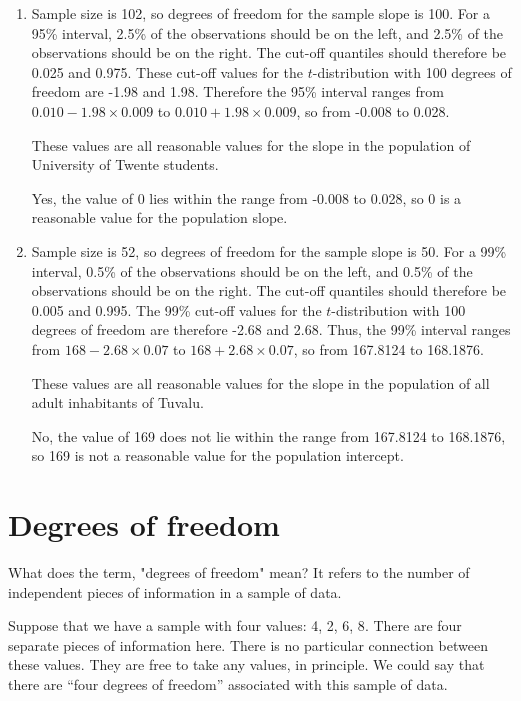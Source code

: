 \documentclass[]{report}\usepackage[]{graphicx}\usepackage[]{color}
\begin{document}
\begin{enumerate}

\item Sample size is 102, so degrees of freedom for the sample slope is 100. For a 95\% interval, 2.5\% of the observations should be on the left, and 2.5\% of the observations should be on the right. The cut-off quantiles should therefore be 0.025 and 0.975. These cut-off values for the $t$-distribution with 100 degrees of freedom are -1.98 and 1.98. Therefore the 95\% interval ranges from $0.010 - 1.98 \times 0.009$ to $0.010 + 1.98 \times 0.009$, so from -0.008 to 0.028.

\subitem These values are all reasonable values for the slope in the population of University of Twente students.

\subitem Yes, the value of 0 lies within the range from -0.008 to 0.028, so 0 is a reasonable value for the population slope.

\item Sample size is 52, so degrees of freedom for the sample slope is 50. For a 99\% interval, 0.5\% of the observations should be on the left, and 0.5\% of the observations should be on the right. The cut-off quantiles should therefore be 0.005 and 0.995. The 99\% cut-off values for the $t$-distribution with 100 degrees of freedom are therefore -2.68 and 2.68. Thus, the 99\% interval ranges from $168 - 2.68 \times 0.07$ to $168 + 2.68 \times 0.07$, so from 167.8124 to 168.1876.

\subitem These values are all reasonable values for the slope in the population of all adult inhabitants of Tuvalu.

\subitem No, the value of 169 does not lie within the range from 167.8124 to 168.1876, so 169 is not a reasonable value for the population intercept.


\end{enumerate}


\section{Degrees of freedom}


What does the term, "degrees of freedom" mean? It refers to the number of independent pieces of information in a sample of data.

Suppose that we have a sample with four values: {4, 2, 6, 8}. There are four separate pieces of information here. There is no particular connection between these values. They are free to take any values, in principle. We could say that there are “four degrees of freedom” associated with this sample of data.
\end{document}
